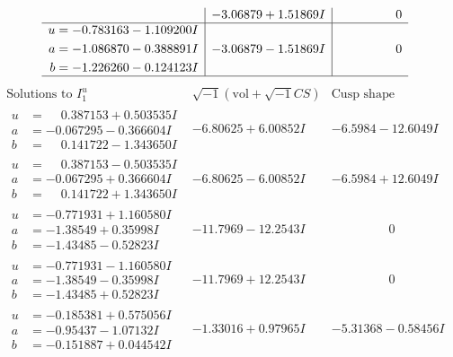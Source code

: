 \documentclass[1p]{elsarticle_modified}
\theoremstyle{definition}
\newcommand{\I}{\sqrt{-1}}
\begin{document}
$$\begin{array}{c|c|c}
 & -3.06879 + 1.51869 I & \phantom{-0.000000 } 0 \\ \hline\begin{aligned}
u &= -0.783163 - 1.109200 I \\
a &= -1.086870 - 0.388891 I \\
b &= -1.226260 - 0.124123 I\end{aligned}
 & -3.06879 - 1.51869 I & \phantom{-0.000000 } 0\\
 \hline 
 \end{array}$$\newpage$$\begin{array}{c|c|c}  
\text{Solutions to }I^u_{1}& \I (\text{vol} + \sqrt{-1}CS) & \text{Cusp shape}\\
 \hline 
\begin{aligned}
u &= \phantom{-}0.387153 + 0.503535 I \\
a &= -0.067295 - 0.366604 I \\
b &= \phantom{-}0.141722 - 1.343650 I\end{aligned}
 & -6.80625 + 6.00852 I & -6.5984 - 12.6049 I \\ \hline\begin{aligned}
u &= \phantom{-}0.387153 - 0.503535 I \\
a &= -0.067295 + 0.366604 I \\
b &= \phantom{-}0.141722 + 1.343650 I\end{aligned}
 & -6.80625 - 6.00852 I & -6.5984 + 12.6049 I \\ \hline\begin{aligned}
u &= -0.771931 + 1.160580 I \\
a &= -1.38549 + 0.35998 I \\
b &= -1.43485 - 0.52823 I\end{aligned}
 & -11.7969 - 12.2543 I & \phantom{-0.000000 } 0 \\ \hline\begin{aligned}
u &= -0.771931 - 1.160580 I \\
a &= -1.38549 - 0.35998 I \\
b &= -1.43485 + 0.52823 I\end{aligned}
 & -11.7969 + 12.2543 I & \phantom{-0.000000 } 0 \\ \hline\begin{aligned}
u &= -0.185381 + 0.575056 I \\
a &= -0.95437 - 1.07132 I \\
b &= -0.151887 + 0.044542 I\end{aligned}
 & -1.33016 + 0.97965 I & -5.31368 - 0.58456 I \\ \hline\begin{aligned}

\end{aligned}
\end{array}$$
\end{document}
